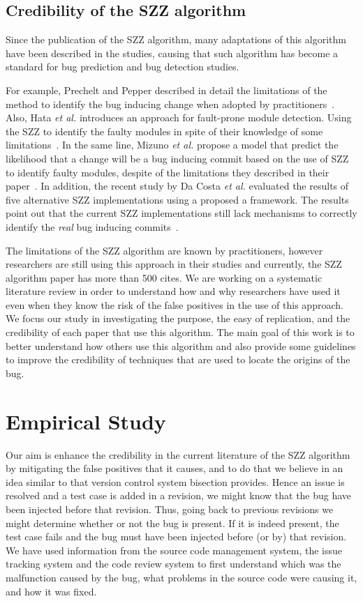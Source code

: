 \documentclass[a4paper]{article}
\begin{document}
\subsection{Credibility of the SZZ algorithm}

Since the publication of the SZZ algorithm, many adaptations of this algorithm have been described in the studies, causing that such algorithm has become a standard for bug prediction and bug detection studies.

For example, Prechelt and Pepper described in detail the limitations of the method to identify the bug inducing change when adopted by practitioners~\cite{prechelt2014software}. Also, Hata \emph{et al.} introduces an approach for fault-prone module detection. Using the SZZ to identify the faulty modules in spite of their knowledge of some limitations~\cite{hata2010fault}. In the same line, Mizuno \emph{et al.} propose a model that predict the likelihood that a change will be a bug inducing commit based on the use of SZZ to identify faulty modules, despite of the limitations they described in their paper~\cite{mizuno2010prediction}. In addition, the recent study by Da Costa \emph{et al.} evaluated the results of five alternative SZZ implementations using a proposed a framework. The results point out that the current SZZ implementations still lack mechanisms to correctly identify the \emph{real} bug inducing commits~\cite{da2016framework}.

The limitations of the SZZ algorithm are known by practitioners, however researchers are still using this approach in their studies and currently, the SZZ algorithm paper has more than 500 cites. We are working on a systematic literature review in order to understand how and why researchers have used it even when they know the risk of the false positives in the use of this approach. We focus our study in investigating the purpose, the easy of replication, and the credibility of each paper that use this algorithm. The main goal of this work is to better understand how others use this algorithm and also provide some guidelines to improve the credibility of techniques that are used to locate the origins of the bug.

\section{Empirical Study}

Our aim is enhance the credibility in the current literature of the SZZ algorithm by mitigating the false positives that it causes, and to do that we believe in an idea similar to that version control system bisection provides. Hence an issue is resolved and a test case is added in a revision, we might know that the bug have been injected before that revision. Thus, going back to previous revisions we might determine whether or not the bug is present. If it is indeed present, the test case fails and the bug must have been injected before (or by) that revision. We have used information from the source code management system, the issue tracking system and the code review system to first understand which was the malfunction caused by the bug, what problems in the source code were causing it, and how it was fixed. 
\end{document}
